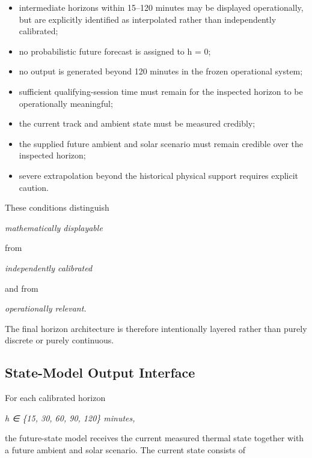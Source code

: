 \begin{itemize}
\item intermediate horizons within 15--120 minutes may be displayed operationally, but are explicitly identified as interpolated rather than independently calibrated;
\item no probabilistic future forecast is assigned to h = 0;
\item no output is generated beyond 120 minutes in the frozen operational system;
\item sufficient qualifying-session time must remain for the inspected horizon to be operationally meaningful;
\item the current track and ambient state must be measured credibly;
\item the supplied future ambient and solar scenario must remain credible over the inspected horizon;
\item severe extrapolation beyond the historical physical support requires explicit caution.
\end{itemize}

These conditions distinguish

\begin{center}\textit{mathematically displayable}\end{center}

from

\begin{center}\textit{independently calibrated}\end{center}

and from

\begin{center}\textit{operationally relevant.}\end{center}

The final horizon architecture is therefore intentionally layered rather than purely discrete or purely continuous.

\subsection{State-Model Output Interface}
For each calibrated horizon

\begin{center}\textit{h ∈ \{15, 30, 60, 90, 120\} minutes,}\end{center}

the future-state model receives the current measured thermal state together with a future ambient and solar scenario. The current state consists of

